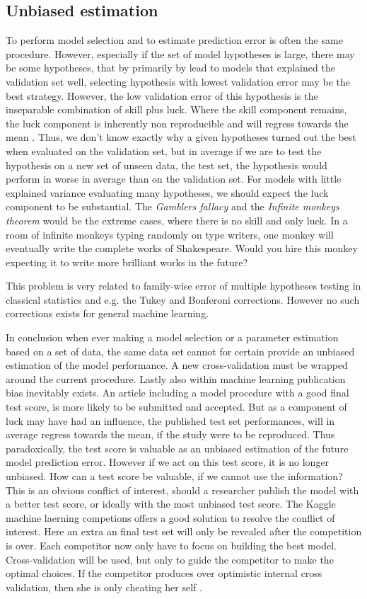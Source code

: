 \subsection{Unbiased estimation}
To perform model selection and to estimate prediction error is often the same procedure. However, especially if the set of model hypotheses is large, there may be some hypotheses, that by primarily by lead to models that explained the validation set well, selecting hypothesis with lowest validation error may be the best strategy. However, the low validation error of this hypothesis is the inseparable combination of skill plus luck. Where the skill component remains, the luck component is inherently non reproducible and will regress towards the mean \cite{kahneman2011thinking}. Thus, we don't know exactly why a given hypotheses turned out the best when evaluated on the validation set, but in average if we are to test the hypothesis on a new set of unseen data, the test set, the hypothesis would perform in worse in average than on the validation set. For models with little explained variance evaluating many hypotheses, we should expect the luck component to be substantial. The \textit{Gamblers fallacy} and the \textit{Infinite monkeys theorem} would be the extreme cases, where there is no skill and only luck. In a room of infinite monkeys typing randomly on type writers, one monkey will eventually write the complete works of Shakespeare. Would you hire this monkey expecting it to write more brilliant works in the future? \cite{wiki:gamblers,monkeys}

This problem is very related to family-wise error of multiple hypotheses testing in classical statistics and e.g. the Tukey and Bonferoni corrections. However no such corrections exists for general machine learning.

In conclusion when ever making a model selection or a parameter estimation based on a set of data, the same data set cannot for certain provide an unbiased estimation of the model performance. A new cross-validation must be wrapped around the current procedure. Lastly also within machine learning publication bias inevitably exists. An article including a model procedure with a good final test score, is more likely to be submitted and accepted. But as a component of luck may have had an influence, the published test set performances, will in average regress towards the mean, if the study were to be reproduced. Thus paradoxically, the test score is valuable as an unbiased estimation of the future model prediction error. However if we act on this test score, it is no longer unbiased. How can a test score be valuable, if we cannot use the information? This is an obvious conflict of interest, should a researcher publish the model with a better test score, or ideally with the most unbiased test score. The Kaggle machine laerning competions offers a good solution to resolve the conflict of interest. Here an extra an final test set will only be revealed after the competition is over. Each competitor now only have to focus on building the best model. Cross-validation will be used, but only to guide the competitor to make the optimal choices. If the competitor produces over optimistic internal cross validation, then she is only cheating her self \cite{seroussi2015steps}.

